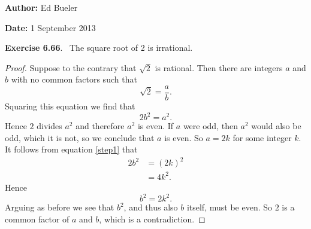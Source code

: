 \documentclass{amsart}
\newcommand{\exer}[1]{\noindent \textbf{Exercise #1}. \,}
\begin{document}
\noindent \textbf{Author:} Ed Bueler
\medskip

\noindent \textbf{Date:} 1 September 2013
\bigskip\bigskip

\exer{6.66} The square root of 2 is irrational.
\medskip

\begin{proof}
Suppose to the contrary that $\sqrt{2}$ is rational. Then
there are integers $a$ and $b$ with no common factors such that 
\begin{equation*}
\sqrt{2} = \frac{a}{b}.
\end{equation*}
Squaring this equation we find that
\begin{equation} \label{step1}
2 b^2 = a^2.
\end{equation}
Hence $2$ divides $a^2$ and therefore $a^2$ is even.  
If $a$ were odd, then $a^2$ would also be odd, which it is not, so we conclude
that $a$ is even.  So $a=2k$ for some integer $k$.  It follows from equation
\eqref{step1} that 
\begin{align*}
  2 b^2 &= (2k)^2\\
        &= 4 k^2.
\end{align*}
Hence
\begin{equation*}
b^2 = 2 k^2.
\end{equation*}
Arguing as before we see that $b^2$, and thus also $b$ itself, must be even.
So $2$ is a common factor of $a$ and $b$, which is a contradiction.
\end{proof}
\end{document}
